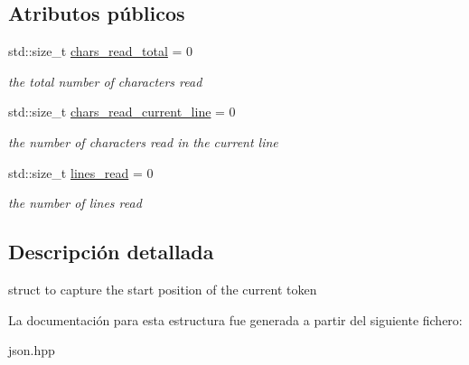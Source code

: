 \subsection*{Atributos públicos}
\begin{DoxyCompactItemize}
\item 
\mbox{\label{structnlohmann_1_1detail_1_1position__t_a94cf85cd91d478c20ae143eba906ea1a}} 
std\+::size\+\_\+t \mbox{\hyperlink{structnlohmann_1_1detail_1_1position__t_a94cf85cd91d478c20ae143eba906ea1a}{chars\+\_\+read\+\_\+total}} = 0
\begin{DoxyCompactList}\small\item\em the total number of characters read \end{DoxyCompactList}\item 
\mbox{\label{structnlohmann_1_1detail_1_1position__t_a74df94563dd32102152ceb8c6d9041d8}} 
std\+::size\+\_\+t \mbox{\hyperlink{structnlohmann_1_1detail_1_1position__t_a74df94563dd32102152ceb8c6d9041d8}{chars\+\_\+read\+\_\+current\+\_\+line}} = 0
\begin{DoxyCompactList}\small\item\em the number of characters read in the current line \end{DoxyCompactList}\item 
\mbox{\label{structnlohmann_1_1detail_1_1position__t_a4bbad8bc2c0d17c1b61c3ce729908b71}} 
std\+::size\+\_\+t \mbox{\hyperlink{structnlohmann_1_1detail_1_1position__t_a4bbad8bc2c0d17c1b61c3ce729908b71}{lines\+\_\+read}} = 0
\begin{DoxyCompactList}\small\item\em the number of lines read \end{DoxyCompactList}\end{DoxyCompactItemize}


\subsection{Descripción detallada}
struct to capture the start position of the current token 

La documentación para esta estructura fue generada a partir del siguiente fichero\+:\begin{DoxyCompactItemize}
\item 
json.\+hpp\end{DoxyCompactItemize}
